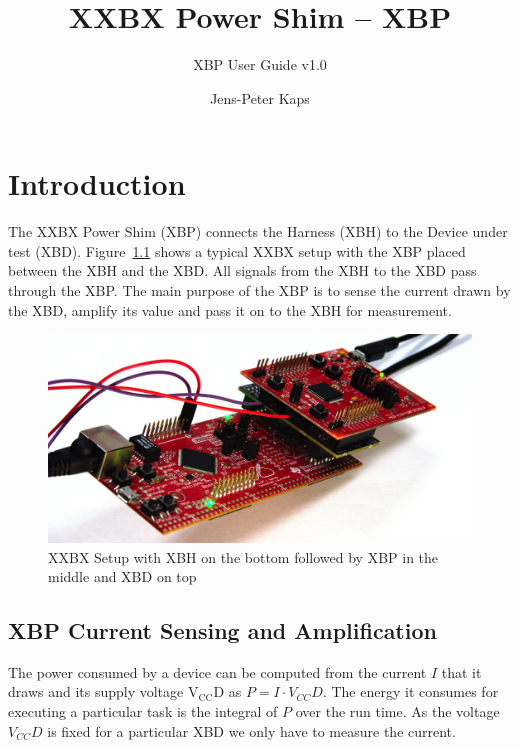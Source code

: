\documentclass[twoside,11pt]{cergdoc}
\begin{document}
\title{XXBX Power Shim -- XBP}
\subtitle{XBP User Guide v1.0}
\author{Jens-Peter Kaps}

\maketitle

\tableofcontents

\chapter{Introduction}
The XXBX Power Shim (XBP) connects the Harness (XBH) to the Device under test (XBD). Figure~\ref{fig:xxbxsetup}
shows a typical XXBX setup with the XBP placed between the XBH and the XBD. All signals from the 
XBH to the XBD pass through the XBP. The main purpose of the XBP is to sense the current 
drawn by the XBD, amplify its value and pass it on to the XBH for measurement. 

\begin{figure}[ht]
  \begin{center}
    \includegraphics[scale=1]{figures/xxbx-setup-side}
    \caption{XXBX Setup with XBH on the bottom followed by XBP in the middle and XBD on top}\label{fig:xxbxsetup}
  \end{center}
\end{figure}

\section{XBP Current Sensing and Amplification}\label{sec:sensing}
The power consumed by a device can be computed from the current $I$ that it draws and
its supply voltage $\mathrm{V_{CC}D}$ as $P = I \cdot V_{CC}D$. The energy it 
consumes for executing a particular task is the integral of $P$ over the run time.
As the voltage $V_{CC}D$ is fixed for a particular XBD we only have to measure 
the current.
\end{document}
